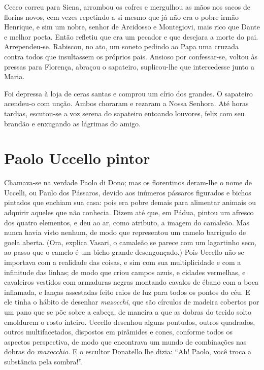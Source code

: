 Cecco correu para Siena, arrombou os cofres e mergulhou as mãos nos sacos
de florins novos, cem vezes repetindo a si mesmo que já não era o pobre
irmão Henrique, e sim um nobre, senhor de Arcidosso e Montegiovi, mais
rico que Dante e melhor poeta. Então refletiu que era um pecador e que
desejara a morte do pai. Arrependeu-se. Rabiscou, no ato, um soneto
pedindo ao Papa uma cruzada contra todos que insultassem os próprios pais.
Ansioso por confessar-se, voltou às pressas para Florença, abraçou o
sapateiro, suplicou-lhe que intercedesse junto a Maria.

Foi depressa à loja de ceras santas e comprou um círio dos grandes. O
sapateiro acendeu-o com unção. Ambos choraram e rezaram a Nossa Senhora.
Até horas tardias, escutou-se a voz serena do sapateiro entoando louvores,
feliz com seu brandão e enxugando as lágrimas do amigo.

\chapter{Paolo Uccello pintor}

Chamava-se na verdade Paolo di Dono; mas os florentinos deram-lhe o nome de
Uccelli, ou Paulo dos Pássaros, devido aos inúmeros pássaros figurados e
bichos pintados que enchiam sua casa: pois era pobre demais para alimentar
animais ou adquirir aqueles que não conhecia. Dizem até que, em Pádua,
pintou um afresco dos quatro elementos, e deu ao ar, como atributo, a
imagem do camaleão. Mas nunca havia visto nenhum, de modo que representou
um camelo barrigudo de goela aberta. (Ora, explica Vasari, o camaleão se
parece com um lagartinho seco, ao passo que o camelo é um bicho grande
desengonçado.) Pois Uccello não se importava com a realidade das coisas, e
sim com sua multiplicidade e com a infinitude das linhas; de modo que
criou campos azuis, e cidades vermelhas, e cavaleiros vestidos com
armaduras negras montando cavalos de ébano com a boca inflamada, e lanças
assestadas feito raios de luz para todos os pontos do céu. E ele tinha o
hábito de desenhar \textit{mazocchi}, que são círculos de madeira cobertos
por um pano que se põe sobre a cabeça, de maneira a que as dobras do
tecido solto emoldurem o rosto inteiro. Uccello desenhou alguns pontudos,
outros quadrados, outros multifacetados, dispostos em pirâmides e cones,
conforme todos os aspectos perspectiva, de modo que encontrava um mundo de
combinações nas dobras do \textit{mazocchio}. E o escultor Donatello lhe
dizia: “Ah! Paolo, você troca a substância pela sombra!”.

